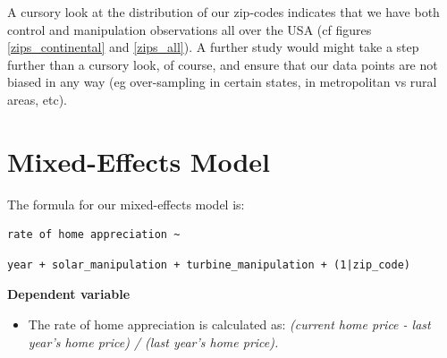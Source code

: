 \documentclass{article}
\begin{document}
A cursory look at the distribution of our zip-codes indicates that we have both control and manipulation observations all over the USA (cf figures \ref{zips_continental} and \ref{zips_all}).
A further study would might take a step further than a cursory look, of course, and ensure that our data points are not biased in any way (eg over-sampling in certain states, in metropolitan vs rural areas, etc).


\section{Mixed-Effects Model}

The formula for our mixed-effects model is:
\begin{verbatim}
rate of home appreciation ~ 
\end{verbatim}
\begin{verbatim}
year + solar_manipulation + turbine_manipulation + (1|zip_code)
\end{verbatim}

\textbf{Dependent variable}
\begin{itemize}
\item The rate of home appreciation is calculated as: \emph{(current home price - last year's home price) / (last year's home price).}
\end{itemize}
\end{document}
